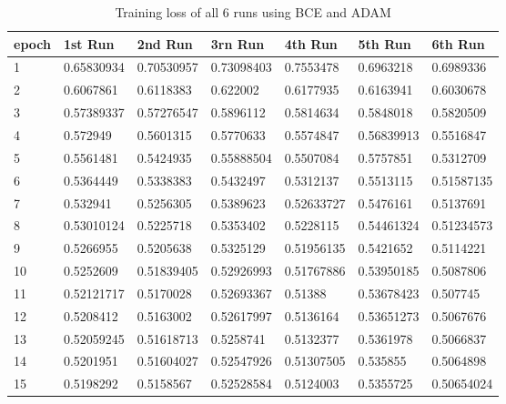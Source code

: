 \begin{table}[!ht]
    \centering
    \begin{tabular}{|l||l||l||l||l||l||l|}
    \hline
    epoch & 1st Run & 2nd Run & 3rn Run & 4th Run & 5th Run & 6th Run \\ \hline
        1 & 0.65830934 & 0.70530957 & 0.73098403 & 0.7553478 & 0.6963218 & 0.6989336 \\ \hline
        2 & 0.6067861 & 0.6118383 & 0.622002 & 0.6177935 & 0.6163941 & 0.6030678 \\ \hline
        3 & 0.57389337 & 0.57276547 & 0.5896112 & 0.5814634 & 0.5848018 & 0.5820509 \\ \hline
        4 & 0.572949 & 0.5601315 & 0.5770633 & 0.5574847 & 0.56839913 & 0.5516847 \\ \hline
        5 & 0.5561481 & 0.5424935 & 0.55888504 & 0.5507084 & 0.5757851 & 0.5312709 \\ \hline
        6 & 0.5364449 & 0.5338383 & 0.5432497 & 0.5312137 & 0.5513115 & 0.51587135 \\ \hline
        7 & 0.532941 & 0.5256305 & 0.5389623 & 0.52633727 & 0.5476161 & 0.5137691 \\ \hline
        8 & 0.53010124 & 0.5225718 & 0.5353402 & 0.5228115 & 0.54461324 & 0.51234573 \\ \hline
        9 & 0.5266955 & 0.5205638 & 0.5325129 & 0.51956135 & 0.5421652 & 0.5114221 \\ \hline
        10 & 0.5252609 & 0.51839405 & 0.52926993 & 0.51767886 & 0.53950185 & 0.5087806 \\ \hline
        11 & 0.52121717 & 0.5170028 & 0.52693367 & 0.51388 & 0.53678423 & 0.507745 \\ \hline
        12 & 0.5208412 & 0.5163002 & 0.52617997 & 0.5136164 & 0.53651273 & 0.5067676 \\ \hline
        13 & 0.52059245 & 0.51618713 & 0.5258741 & 0.5132377 & 0.5361978 & 0.5066837 \\ \hline
        14 & 0.5201951 & 0.51604027 & 0.52547926 & 0.51307505 & 0.535855 & 0.5064898 \\ \hline
        15 & 0.5198292 & 0.5158567 & 0.52528584 & 0.5124003 & 0.5355725 & 0.50654024 \\ \hline
    \end{tabular}
    \caption{\label{tab:bce_adam_train}Training loss of all 6 runs using BCE and ADAM}
\end{table}